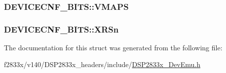 \subsubsection[{V\+M\+A\+P\+S}]{ D\+E\+V\+I\+C\+E\+C\+N\+F\+\_\+\+B\+I\+T\+S\+::\+V\+M\+A\+P\+S}\label{struct_d_e_v_i_c_e_c_n_f___b_i_t_s_a14af9e21e021a1b3aef54add60dfe524}
\hypertarget{struct_d_e_v_i_c_e_c_n_f___b_i_t_s_a538fb89b1cd0fddbb9a5e3e2b0699a21}{}
\subsubsection[{X\+R\+Sn}]{ D\+E\+V\+I\+C\+E\+C\+N\+F\+\_\+\+B\+I\+T\+S\+::\+X\+R\+Sn}\label{struct_d_e_v_i_c_e_c_n_f___b_i_t_s_a538fb89b1cd0fddbb9a5e3e2b0699a21}


The documentation for this struct was generated from the following file\+:\begin{DoxyCompactItemize}
\item 
f2833x/v140/\+D\+S\+P2833x\+\_\+headers/include/\hyperlink{_d_s_p2833x___dev_emu_8h}{D\+S\+P2833x\+\_\+\+Dev\+Emu.\+h}\end{DoxyCompactItemize}

